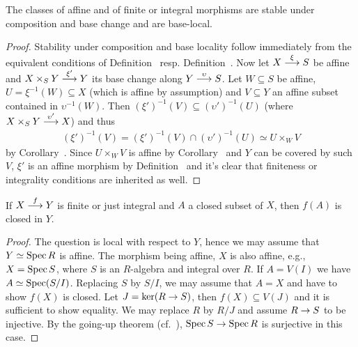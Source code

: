 \documentclass[a4paper,parskip=half,numbers=enddot, DIV=12]{scrreprt}
\begin{document}
\begin{cor}
    The classes of affine and of finite or integral morphisms are stable under composition and base change and are base-local.
\end{cor}
\begin{proof}
	Stability under composition and base locality follow immediately from the equivalent conditions of Definition~ resp. Definition~. Now let $X\morphism[\xi]S$ be affine and $X\times_SY\morphism[\xi']Y$ its base change along $Y\morphism[\upsilon] S$. Let $W\subseteq S$ be affine, $U=\xi^{-1}(W)\subseteq X$ (which is affine by assumption) and $V\subseteq Y$ an affine subset contained in $\upsilon^{-1}(W)$. Then $(\xi')^{-1}(V)\subseteq(\upsilon')^{-1}(U)$ (where $X\times_SY\morphism[\upsilon']X$) and thus
	\begin{align*}
		(\xi')^{-1}(V)=(\xi')^{-1}(V)\cap (\upsilon')^{-1}(U)\simeq U\times_WV
	\end{align*}
	by Corollary~. Since $U\times_WV$ is affine by Corollary~ and $Y$ can be covered by such $V$, $\xi'$ is an affine morphism by Definition~ and it's clear that finiteness or integrality conditions are inherited as well.
\end{proof}
\begin{prop}
    If $X\morphism[f] Y$ is finite or just integral and $A$ a closed subset of $X$, then $f(A)$ is closed in $Y$.
\end{prop}
\begin{proof}
    The question is local with respect to $Y$, hence we may assume that $Y\simeq \operatorname{Spec} R$ is affine. The morphism being affine, $X$ is also affine, e.g., $X= \operatorname{Spec} S$, where $S$ is an $R$-algebra and integral over $R$. If $A=V(I)$ we have $A\simeq \operatorname{Spec}(S/I)$. Replacing $S$ by $S/I$, we may assume that $A=X$ and have to show $f(X)$ is closed. Let $J = \ker(R\morphism S)$, then $f(X)\subseteq V(J)$ and it is sufficient to show equality. We may replace $R$ by $R/J$ and assume $R\morphism S$ to be injective. By the going-up theorem (cf.\ \cite[Theorem~7]{alg1}), $\Spec S\morphism \Spec R$ is surjective in this case. 
\end{proof}
\end{document}
